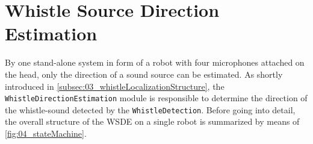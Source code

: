 \section{Whistle Source Direction Estimation} 
\label{subsec:03_directionEstimation}

By one stand-alone system in form of a robot with four microphones
attached on the head, only the direction of a sound source can be
estimated. 
As shortly introduced in \cref{subsec:03_whistleLocalizationStructure},
the \lstinline!WhistleDirectionEstimation! module is responsible to
determine the direction of the whistle-sound detected by the \lstinline!WhistleDetection!.
Before going into detail, the overall structure of the \ac{WSDE} on a single robot
is summarized by means of \cref{fig:04_stateMachine}.

